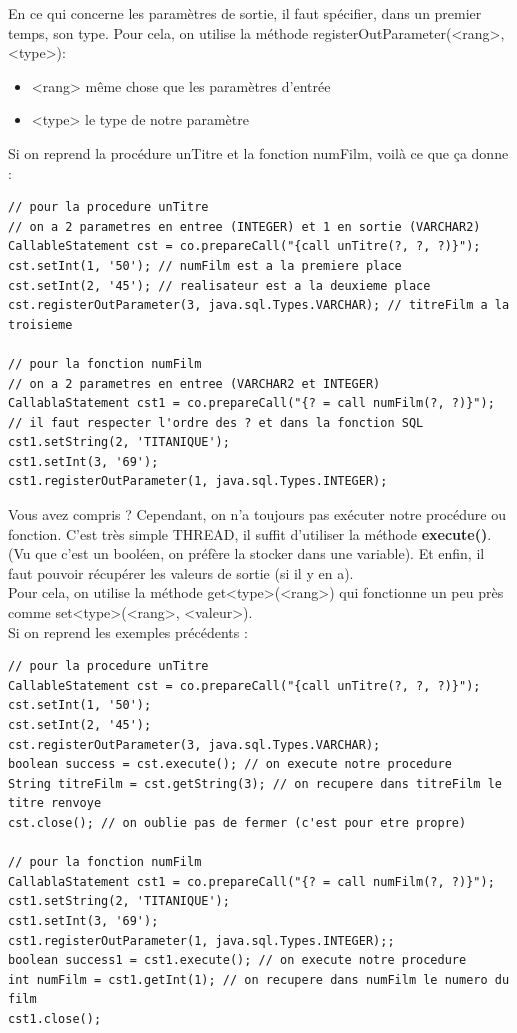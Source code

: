 \documentclass{report}
\begin{document}
En ce qui concerne les paramètres de sortie, il faut spécifier, dans un premier temps, son type. Pour cela, on utilise la méthode registerOutParameter(<rang>, <type>):
\begin{itemize}
\item <rang> même chose que les paramètres d'entrée
\item <type> le type de notre paramètre
\end{itemize}

Si on reprend la procédure unTitre et la fonction numFilm, voilà ce que ça donne :
\begin{lstlisting}[style=MyJavaStyle]
// pour la procedure unTitre
// on a 2 parametres en entree (INTEGER) et 1 en sortie (VARCHAR2)
CallableStatement cst = co.prepareCall("{call unTitre(?, ?, ?)}");
cst.setInt(1, '50'); // numFilm est a la premiere place
cst.setInt(2, '45'); // realisateur est a la deuxieme place  
cst.registerOutParameter(3, java.sql.Types.VARCHAR); // titreFilm a la troisieme

// pour la fonction numFilm
// on a 2 parametres en entree (VARCHAR2 et INTEGER)
CallablaStatement cst1 = co.prepareCall("{? = call numFilm(?, ?)}");
// il faut respecter l'ordre des ? et dans la fonction SQL
cst1.setString(2, 'TITANIQUE'); 
cst1.setInt(3, '69');
cst1.registerOutParameter(1, java.sql.Types.INTEGER);
\end{lstlisting}
Vous avez compris ? Cependant, on n'a toujours pas exécuter notre procédure ou fonction. C'est très simple THREAD, il suffit d'utiliser la méthode \textbf{execute()}.
(Vu que c'est un booléen, on préfère la stocker dans une variable).
Et enfin, il faut pouvoir récupérer les valeurs de sortie (si il y en a).\\
Pour cela, on utilise la méthode get<type>(<rang>) qui fonctionne un peu près comme set<type>(<rang>, <valeur>).\\
Si on reprend les exemples précédents :
\begin{lstlisting}[style=MyJavaStyle]
// pour la procedure unTitre
CallableStatement cst = co.prepareCall("{call unTitre(?, ?, ?)}");
cst.setInt(1, '50');
cst.setInt(2, '45');
cst.registerOutParameter(3, java.sql.Types.VARCHAR);
boolean success = cst.execute(); // on execute notre procedure
String titreFilm = cst.getString(3); // on recupere dans titreFilm le titre renvoye
cst.close(); // on oublie pas de fermer (c'est pour etre propre)

// pour la fonction numFilm
CallablaStatement cst1 = co.prepareCall("{? = call numFilm(?, ?)}");
cst1.setString(2, 'TITANIQUE'); 
cst1.setInt(3, '69');
cst1.registerOutParameter(1, java.sql.Types.INTEGER);;
boolean success1 = cst1.execute(); // on execute notre procedure
int numFilm = cst1.getInt(1); // on recupere dans numFilm le numero du film
cst1.close(); 
\end{lstlisting}
\end{document}
